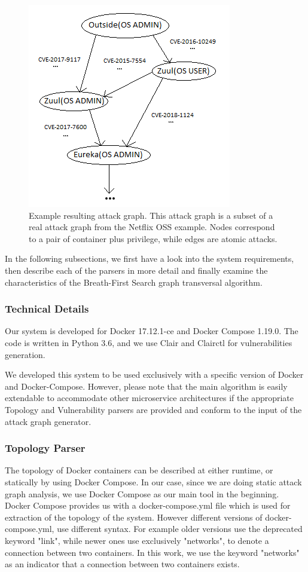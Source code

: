 \begin{figure}
	\includegraphics[]{./images/Attack_graph}
	\caption{Example resulting attack graph. This attack graph is a subset of a real attack graph from the Netflix OSS example. Nodes correspond to a pair of container plus privilege, while edges are atomic attacks.}
	\label{AttackGraph}
\end{figure}


In the following subsections, we first have a look into the system requirements, then describe each of the parsers in more detail and finally examine the characteristics of the Breath-First Search graph transversal algorithm.

\subsubsection{Technical Details}
Our system is developed for Docker 17.12.1-ce and Docker Compose 1.19.0. The code is written in Python 3.6, and we use Clair \cite{clair} and Clairctl \cite{clairctl} for vulnerabilities generation.

We developed this system to be used exclusively with a specific version of Docker and Docker-Compose. However, please note that the main algorithm is easily extendable to accommodate other microservice architectures if the appropriate Topology and Vulnerability parsers are provided and conform to the input of the attack graph generator.

\subsubsection{Topology Parser}
The topology of Docker containers can be described at either runtime, or statically by using Docker Compose. In our case, since we are doing static attack graph analysis, we use Docker Compose as our main tool in the beginning. Docker Compose provides us with a docker-compose.yml file which is used for extraction of the topology of the system. However different versions of docker-compose.yml, use different syntax. For example older versions use the deprecated keyword "link", while newer ones use exclusively "networks", to denote a connection between two containers. In this work, we use the keyword "networks" as an indicator that a connection between two containers exists.

